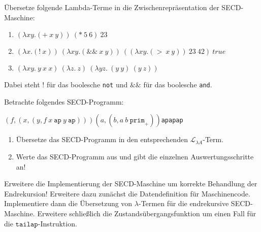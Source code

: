\begin{aufgabe}
  Übersetze folgende Lambda-Terme in die Zwischenrepräsentation
  der SECD-Maschine:
  
  \begin{enumerate}
  \item \((\lambda xy.(+\:x\:y))\:(*\:5\:6)\:23\)

  \item \((\lambda x.(!\:x))\:(\lambda xy.(\&\&\:x\:y))\:((\lambda xy.(>\:x\:y))\:23~42)\:true\)

   
  \item \((\lambda xy.\:y\:x\:x)\:(\lambda z.\:z)\:(\lambda yz.\:(y\:y)\:(y\:z))\)

  \end{enumerate}

  Dabei steht $!$ für das boolesche \texttt{not} und $\&\&$ für das
  boolesche \texttt{and}.
\end{aufgabe}

\begin{aufgabe}
 Betrachte folgendes SECD-Programm:
 
 \newcommand{\tuple}[2]{\ensuremath{(#1,#2)}}

 \begin{center}
   \tuple{f}{\tuple{x}{\tuple{y}{f\:x\:\texttt{ap}\:y\:\texttt{ap}}}}\:\tuple{a}{\tuple{b}{a\:b\:\texttt{prim}_+}}\:\texttt{ap}\:\texttt{ap}\:\texttt{ap}
 \end{center}
 
 \begin{enumerate}
   \item Übersetze das SECD-Programm in den entsprechenden
   $\mathcal{L}_{\lambda{}A}$-Term.
   \item Werte das SECD-Programm aus und gibt die einzelnen
     Auswertungsschritte an!
 \end{enumerate}
  
\end{aufgabe}

\begin{aufgabe}\label{aufgabe:secd-endekursiv-implementieren}
  Erweitere die Implementierung der SECD-Maschine um korrekte
  Behandlung der Endrekursion!  Erweitere dazu zunächst die
  Datendefinition für Maschinencode. Implementiere dann die
  Übersetzung von $\lambda$-Termen für die endrekursive SECD-Maschine.
  Erweitere schließlich die Zustandsübergangsfunktion um einen
  Fall für die $\mathtt{tailap}$-Instruktion.
\end{aufgabe}

